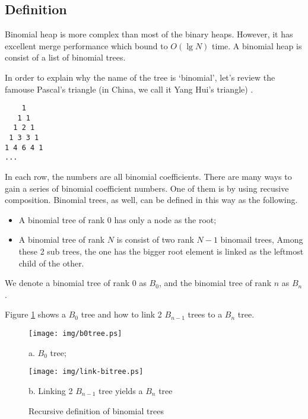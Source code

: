\documentclass{article}
\begin{document}
\subsection{Definition}

Binomial heap is more complex than most of the binary heaps. However,
it has excellent merge performance which bound to $O(\lg N)$ time. A
binomial heap is consist of a list of binomial trees.

In order to explain why the name of the tree is `binomial', let's review
the famouse Pascal's triangle (in China, we call it Yang Hui's triangle)
\cite{wiki-pascal-triangle}.

\begin{verbatim}
    1
   1 1
  1 2 1
 1 3 3 1
1 4 6 4 1
...
\end{verbatim}

In each row, the numbers are all binomial coefficients. There are many
ways to gain a series of binomial coefficient numbers. One of them is
by using recusive composition. Binomial trees, as well, can be defined
in this way as the following.

\begin{itemize}
\item A binomial tree of rank 0 has only a node as the root;
\item A binomial tree of rank $N$ is consist of two rank $N-1$ binomail trees,
Among these 2 sub trees, the one has the bigger root element is linked as the
leftmost child of the other.
\end{itemize}

We denote a binomial tree of rank 0 as $B_0$, and the binomial tree of rank
$n$ as $B_n$.

Figure \ref{fig:link-bitree} shows a $B_0$ tree and how to link 2 $B_{n-1}$
trees to a $B_n$ tree.

\begin{figure}[htbp]
       \begin{center}
       	  \texttt{[image: img/b0tree.ps]}

          a. $B_0$ tree; 

          \texttt{[image: img/link-bitree.ps]}

          b. Linking 2 $B_{n-1}$ tree yields a $B_n$ tree

        \caption{Recursive definition of binomial trees} \label{fig:link-bitree}
       \end{center}
\end{figure}
\end{document}
